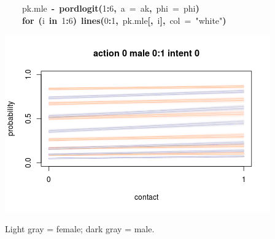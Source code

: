 \documentclass{article}
\makeatletter
\newcommand{\hlnumber}[1]{\textcolor[rgb]{0,0,0}{#1}}%
\newcommand{\hlfunctioncall}[1]{\textcolor[rgb]{.5,0,.33}{\textbf{#1}}}%
\newcommand{\hlstring}[1]{\textcolor[rgb]{.6,.6,1}{#1}}%
\newcommand{\hlkeyword}[1]{\textbf{#1}}%
\newcommand{\hlargument}[1]{\textcolor[rgb]{.69,.25,.02}{#1}}%
\newcommand{\hlassignement}[1]{\textbf{#1}}%
\newcommand{\hlsymbol}[1]{#1}%
\newcommand{\hlstd}[1]{\textcolor[rgb]{0,0,0}{#1}}%
\newenvironment{kframe}{%
 \def\FrameCommand##1{\hskip\@totalleftmargin \hskip-\fboxsep
 \colorbox{shadecolor}{##1}\hskip-\fboxsep
     \hskip-\linewidth \hskip-\@totalleftmargin \hskip\columnwidth}%
 \MakeFramed {\advance\hsize-\width
   \@totalleftmargin\z@ \linewidth\hsize
   \@setminipage}}%
 {\par\unskip\endMakeFramed}
\newenvironment{knitrout}{}{} %
\makeatother
\begin{document}
\begin{knitrout}
{\begin{kframe}
\begin{flushleft}
\hlstd{}{\ }{\ }{\ }{\ }\hlsymbol{pk.mle}{\ }\hlassignement{\usebox{\hlnormalsizeboxlessthan}-}{\ }\hlfunctioncall{pordlogit}\hlkeyword{(}\hlnumber{1}\hlkeyword{:}\hlnumber{6}\hlkeyword{,}{\ }\hlargument{a}{\ }\hlargument{=}{\ }\hlsymbol{ak}\hlkeyword{,}{\ }\hlargument{phi}{\ }\hlargument{=}{\ }\hlsymbol{phi}\hlkeyword{)}\hspace*{\fill}\\
\hlstd{}{\ }{\ }{\ }{\ }\hlkeyword{for}{\ }\hlkeyword{(}\hlsymbol{i}{\ }\hlkeyword{in}{\ }\hlnumber{1}\hlkeyword{:}\hlnumber{6}\hlkeyword{)}{\ }\hlfunctioncall{lines}\hlkeyword{(}\hlnumber{0}\hlkeyword{:}\hlnumber{1}\hlkeyword{,}{\ }\hlsymbol{pk.mle}\hlkeyword{[}\hlkeyword{,}{\ }\hlsymbol{i}\hlkeyword{]}\hlkeyword{,}{\ }\hlargument{col}{\ }\hlargument{=}{\ }\hlstring{"{}white"{}}\hlkeyword{)}\hspace*{\fill}\\
\hlstd{}\hlkeyword{\usebox{\hlnormalsizeboxclosebrace}}\mbox{}
\normalfont
\end{flushleft}


\centering{}\includegraphics{trolley-plots} 

\end{kframe}}
\end{knitrout}


Light gray = female; dark gray = male. 
\end{document}
